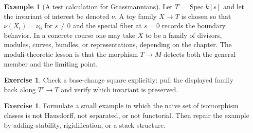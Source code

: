 \documentclass[11pt]{amsart}
\theoremstyle{definition}
\newtheorem{example}[theorem]{Example}
\newtheorem{exercise}[theorem]{Exercise}
\newcommand{\Spec}{\operatorname{Spec}}
\begin{document}
\begin{example}[A test calculation for Grassmannians]
Let $T=\Spec k[s]$ and let the invariant of interest be denoted $\nu$.  A toy family $X\to T$ is chosen so that $\nu(X_t)=\nu_0$ for $s\ne0$ and the special fiber at $s=0$ records the boundary behavior.  In a concrete course one may take $X$ to be a family of divisors, modules, curves, bundles, or representations, depending on the chapter.  The moduli-theoretic lesson is that the morphism $T\to M$ detects both the general member and the limiting point.
\end{example}
\begin{exercise}
Check a base-change square explicitly: pull the displayed family back along $T\prime\to T$ and verify which invariant is preserved.
\end{exercise}
\begin{exercise}
Formulate a small example in which the naive set of isomorphism classes is not Hausdorff, not separated, or not functorial.  Then repair the example by adding stability, rigidification, or a stack structure.
\end{exercise}
\clearpage
\end{document}
